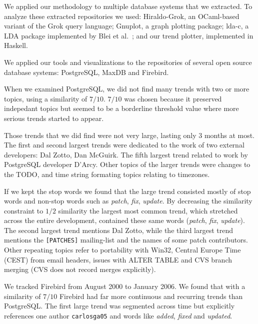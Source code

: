 \documentclass[times, 10pt,twocolumn]{article}
\newcommand{\shrinkit}{\vspace*{-.3em}}
\begin{document}
\shrinkit
{}
\shrinkit

We applied our methodology to multiple database systems that we
extracted.  To analyze these extracted repositories we used:
Hiraldo-Grok, an OCaml-based variant of the Grok query language;
Gnuplot, a graph plotting package; lda-c, a LDA package implemented by
Blei et al.~\cite{944937}; and our trend plotter, implemented in
Haskell.

We applied our tools and visualizations to the repositories of several
open source database systems: PostgreSQL, MaxDB and Firebird.

\shrinkit
{}
\shrinkit


When we examined PostgreSQL, we did not find many trends with two or
more topics, using a similarity of $7/10$. $7/10$ was chosen because
it preserved indepedant topics but seemed to be a borderline threshold
value where more serious trends started to appear.

Those trends that we did find
were not very large, lasting only 3 months at most. The first and second
largest trends were dedicated to the work of two external developers:
Dal Zotto, Dan McGuirk. The fifth largest trend related to work by
PostgreSQL developer D'Arcy. Other topics of the larger trends were
changes to the TODO, and time string formating topics
relating to timezones.

If we kept the stop words we found that the large trend consisted
mostly of stop words and non-stop words such as \emph{patch},
\emph{fix}, \emph{update}.  By decreasing the similarity constraint to
$1/2$ similarity the largest most common trend, which stretched across
the entire development, contained these same words (\emph{patch},
\emph{fix}, \emph{update}). The second largest trend mentions Dal
Zotto, while the third largest trend mentions the \texttt{[PATCHES]}
mailing-list and the names of some patch contributors.  Other repeating
topics refer to portability with Win32, Central Europe Time (CEST)
from email headers, issues with ALTER TABLE and CVS branch merging
(CVS does not record merges explicitly).


\shrinkit
{}
\shrinkit



We tracked Firebird from August 2000 to January 2006. We found that with a
similarity of $7/10$ Firebird had far more continuous and
recurring trends than PostgreSQL.  The first large trend was segmented
across time but explicitly references one author \texttt{carlosga05}
and words like \emph{added}, \emph{fixed} and \emph{updated}.
\end{document}
